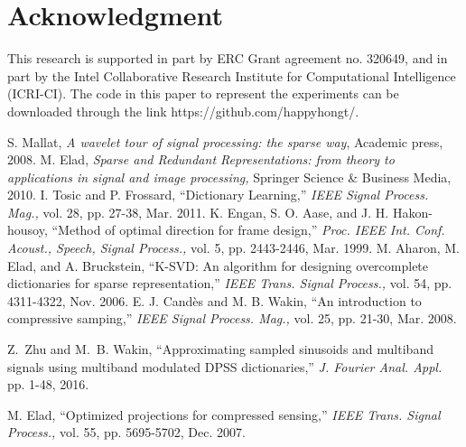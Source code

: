 \documentclass[final,5p,times,twocolumn]{elsarticle}
\begin{document}
\section*{Acknowledgment}
This research is supported in part by ERC Grant agreement no. 320649, and in part by the Intel Collaborative Research Institute for Computational Intelligence (ICRI-CI). The code
in this paper to represent the experiments can be downloaded through the link {https://github.com/happyhongt/}.


\begin{thebibliography}{255}
	S. Mallat, {\it A wavelet tour of signal processing: the sparse way}, Academic press, 2008.
	M. Elad, {\it Sparse and Redundant Representations: from theory to applications in signal and image processing,} Springer Science \& Business Media, 2010.
	 I. Tosic and P. Frossard, ``Dictionary Learning,'' {\it IEEE Signal Process. Mag.,} vol. 28, pp. 27-38, Mar. 2011.
	K. Engan, S. O. Aase, and J. H. Hakon-housoy, ``Method of optimal direction for frame design,'' {\it Proc. IEEE Int. Conf. Acoust., Speech, Signal Process.,} vol. 5, pp. 2443-2446, Mar. 1999.
	M. Aharon, M. Elad, and A. Bruckstein, ``K-SVD: An algorithm for designing overcomplete dictionaries for sparse representation,'' {\it IEEE Trans. Signal Process.,} vol. 54, pp. 4311-4322, Nov. 2006.
	E. J. Cand\`{e}s and M. B. Wakin, ``An introduction to compressive samping,'' {\it IEEE Signal Process. Mag.,} vol. 25, pp. 21-30, Mar. 2008.
	
	Z.~Zhu and M.~B. Wakin, ``Approximating sampled sinusoids and multiband signals
	using multiband modulated \uppercase{DPSS} dictionaries,'' {\it  J. Fourier Anal. Appl.} pp. 1-48, 2016.
	
	
M. Elad, ``Optimized projections for compressed sensing,'' {\it IEEE Trans. Signal Process.,} vol. 55, pp. 5695-5702, Dec. 2007.
	

\end{thebibliography}
\end{document}

